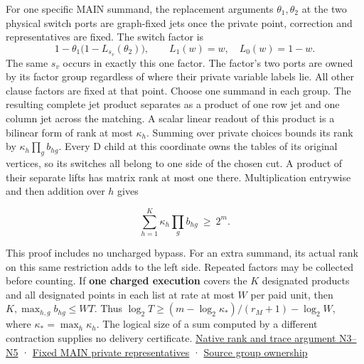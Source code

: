 \documentclass[
  11pt,
]{article}
\begin{document}
For one specific MAIN summand, the replacement arguments
\(\theta_1,\theta_2\) at the two physical switch ports are graph-fixed
jets once the private point, correction and representatives are fixed.
The switch factor is \[
      1-\theta_1\bigl(1-L_{s_v}(\theta_2)\bigr),
      \qquad L_1(w)=w,\quad L_0(w)=1-w .
\] The same \(s_v\) occurs in exactly this one factor. The factor's two
ports are owned by its factor group regardless of where their private
variable labels lie. All other clause factors are fixed at that point.
Choose one summand in each group. The resulting complete jet product
separates as a product of one row jet and one column jet across the
matching. A scalar linear readout of this product is a bilinear form of
rank at most \(\kappa_h\). Summing over private choices bounds its rank
by \(\kappa_h\prod_g b_{hg}\). Every D child at this coordinate owns the
tables of its original vertices, so its switches all belong to one side
of the chosen cut. A product of their separate lifts has matrix rank at
most one there. Multiplication entrywise and then addition over \(h\)
gives

\[
                    \sum_{h=1}^{K}\kappa_h\prod_g b_{hg}
                         \ \ge\ 2^m.                                \tag{C3}
\]

This proof includes no uncharged bypass. For an extra summand, its
actual rank on this same restriction adds to the left side. Repeated
factors may be collected before counting. If \textbf{one charged
execution} covers the \(K\) designated products and all designated
points in each list at rate at most \(W\) per paid unit, then
\(K,\max_{h,g}b_{hg}\le WT\). Thus
\(\log_2 T\ge (m-\log_2\kappa_*)/(r_M+1)-\log_2 W\), where
\(\kappa_*=\max_h\kappa_h\). The logical size of a sum computed by a
different contraction supplies no delivery certificate.
\hyperref[v8-section-native-escape]{Native rank and trace argument N3--N5}
·
\href{https://github.com/openai/math/blob/main/preprints/The-Exponential-Time-Hypothesis-is-False-October-25-2026/build/main_full_version.tex\#L1810}{Fixed
MAIN private representatives} ·
\href{https://github.com/openai/math/blob/main/preprints/The-Exponential-Time-Hypothesis-is-False-October-25-2026/build/main_full_version.tex\#L1964}{Source
group ownership}
\end{document}
